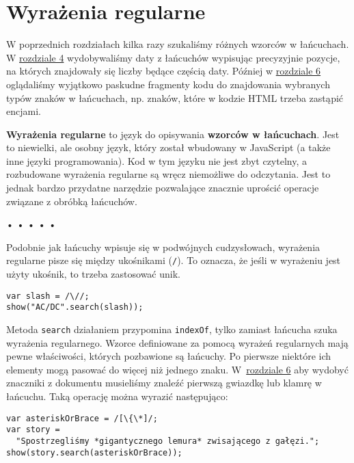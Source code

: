 \chapter{ Wyrażenia regularne}
\label{chap:10}

  
W poprzednich rozdziałach kilka razy szukaliśmy różnych wzorców w łańcuchach. W \hyperref[chap:4]{rozdziale 4} wydobywaliśmy daty z łańcuchów wypisując precyzyjnie pozycje, na których znajdowały się liczby będące częścią daty. Później w \hyperref[chap:6]{rozdziale 6} oglądaliśmy wyjątkowo paskudne fragmenty kodu do znajdowania wybranych typów znaków w łańcuchach, np. znaków, które w kodzie HTML trzeba zastąpić encjami.

  
\textbf{Wyrażenia regularne} to język do opisywania \textbf{wzorców w łańcuchach}. Jest to niewielki, ale osobny język, który został wbudowany w JavaScript (a także inne języki programowania). Kod w tym języku nie jest zbyt czytelny, a rozbudowane wyrażenia regularne są wręcz niemożliwe do odczytania. Jest to jednak bardzo przydatne narzędzie pozwalające znacznie uprościć operacje związane z obróbką łańcuchów.


\begin{center}
• • • • •
\end{center}

  
Podobnie jak łańcuchy wpisuje się w podwójnych cudzysłowach, wyrażenia regularne pisze się między ukośnikami (\texttt{/}\index{/}). To oznacza, że jeśli w wyrażeniu jest użyty ukośnik, to trzeba zastosować unik.

  
\begin{verbatim} 
var slash = /\//;
show("AC/DC".search(slash));
 \end{verbatim}
  
Metoda \texttt{search} działaniem przypomina \texttt{indexOf}, tylko zamiast łańcucha szuka wyrażenia regularnego. Wzorce definiowane za pomocą wyrażeń regularnych mają pewne właściwości, których pozbawione są łańcuchy. Po pierwsze niektóre ich elementy mogą pasować do więcej niż jednego znaku. W~\hyperref[chap:6]{rozdziale 6} aby wydobyć znaczniki z dokumentu musieliśmy znaleźć pierwszą gwiazdkę lub klamrę w łańcuchu. Taką operację można wyrazić następująco:

  
\begin{verbatim} 
var asteriskOrBrace = /[\{\*]/;
var story =
  "Spostrzegliśmy *gigantycznego lemura* zwisającego z gałęzi.";
show(story.search(asteriskOrBrace));
 \end{verbatim}
  
